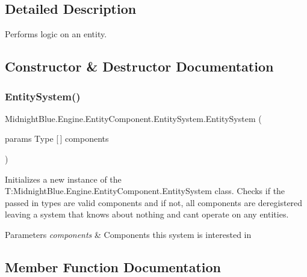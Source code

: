 \subsection{Detailed Description}
Performs logic on an entity. 



\subsection{Constructor \& Destructor Documentation}
\hypertarget{class_midnight_blue_1_1_engine_1_1_entity_component_1_1_entity_system_a29f645d9fbc5a0490dbff81fb7a1fe34}{}\label{class_midnight_blue_1_1_engine_1_1_entity_component_1_1_entity_system_a29f645d9fbc5a0490dbff81fb7a1fe34} 
\subsubsection{\texorpdfstring{Entity\+System()}{EntitySystem()}}
{\footnotesize\ttfamily Midnight\+Blue.\+Engine.\+Entity\+Component.\+Entity\+System.\+Entity\+System (\begin{DoxyParamCaption}\item[{params Type \mbox{[}$\,$\mbox{]}}]{components }\end{DoxyParamCaption})\hspace{0.3cm}{\ttfamily [inline]}}



Initializes a new instance of the T\+:\+Midnight\+Blue.\+Engine.\+Entity\+Component.\+Entity\+System class. Checks if the passed in types are valid components and if not, all components are deregistered leaving a system that knows about nothing and can\textquotesingle{}t operate on any entities. 


\begin{DoxyParams}{Parameters}
{\em components} & Components this system is interested in\\
\hline
\end{DoxyParams}


\subsection{Member Function Documentation}
\hypertarget{class_midnight_blue_1_1_engine_1_1_entity_component_1_1_entity_system_aac75517905c40ef65fa3733ecb90c6d9}{}\label{class_midnight_blue_1_1_engine_1_1_entity_component_1_1_entity_system_aac75517905c40ef65fa3733ecb90c6d9} 
